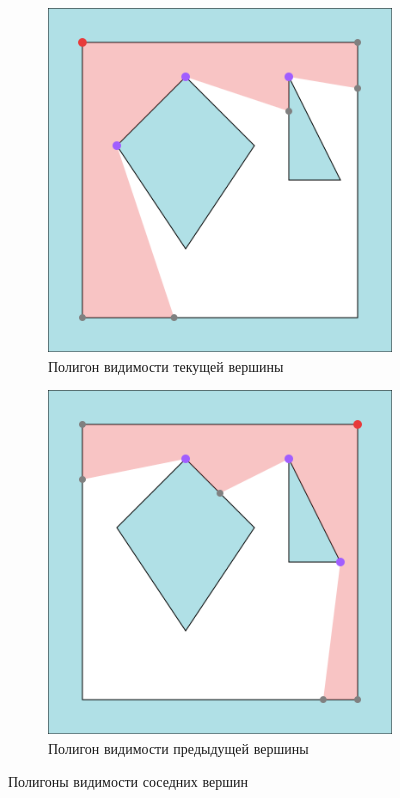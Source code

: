 \documentclass{fefu_thesis/cls/fefu}
\begin{document}
    \begin{figure}[H]
        \centering
        \begin{subfigure}[t]{0.49\linewidth}
            \centering
            \includegraphics[scale=0.5]{images/visibility_polygon_current_vertex.png}
            \caption{Полигон видимости текущей вершины}
        \end{subfigure}
        \begin{subfigure}[t]{0.49\linewidth}
            \centering
            \includegraphics[scale=0.5]{images/visibility_polygon_prev_vertex.png}
            \caption{Полигон видимости предыдущей вершины}
        \end{subfigure}
        \caption{Полигоны видимости соседних вершин}
        \label{VP}
    \end{figure}
\end{document}
